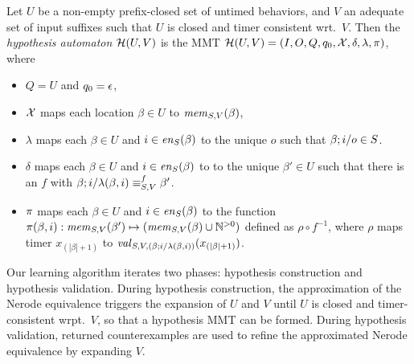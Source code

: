 \begin{definition}
\label{def:hypo}
  Let $U$ be a non-empty prefix-closed set of untimed behaviors,
  and $V$ an adequate set of input suffixes such that
  $U$ is closed and timer consistent wrt.\ $V$. Then the
{\em hypothesis automaton} $\hypoof UV$ is the MMT
$\hypoof UV = (I, O, Q, q_0, \vars, \delta, \lambda, \remap)$, where
\begin{itemize}
\item $Q = U$ and $q_0 = \emptyword$,
\item $\vars$ maps each location $\beta\in U$ to $\apprgetmemorable{S}{\beta}{V}$,
\item $\lambda$ maps each $\beta \in U$ and $i \in \feasibleinputs{\beta}{S}$ to
  the unique $o$ such that $\extend{\beta}{i}{o} \in S$. 
\item $\delta$ maps each $\beta \in U$ and
  $i \in \feasibleinputs{\beta}{S}$ to
  to the unique $\beta' \in U$ such that there is an $f$ with
  $\extend{\beta}{i}{\lambda(\beta,i)} \equiv_{S,V}^f \beta'$.
\item $\remap$
 maps each $\beta \in U$ and $i \in \feasibleinputs{\beta}{S}$ to
  the function
  $\remap(\beta,i):\apprgetmemorable{S}{\beta'}{V} \mapsto (\apprgetmemorable{S}{\beta}{V} \cup \natplus)$ defined as $\rho \circ f^{-1}$, where $\rho$ maps 
  timer $x_{(|\beta|+1)}$ to
$\apprgetassignment{S}{(\extend{\beta}{i}{\lambda(\beta,i)})}{V}(x_{(|\beta|+1)})$.
\end{itemize}
\end{definition}


Our learning algorithm iterates two phases: hypothesis construction and
hypothesis validation.
During hypothesis construction, 
the approximation of the Nerode equivalence triggers the expansion of
$U$ and $V$ until $U$ is closed and timer-consistent wrpt.\ $V$,
so that a hypothesis MMT can be formed.
During hypothesis validation, returned counterexamples are used to refine
the approximated Nerode equivalence by expanding $V$.

